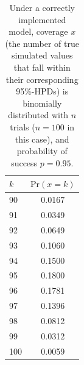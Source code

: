 \documentclass[oneside]{article}
\begin{document}
\begin{table}
\begin{center}
\begin{tabular}{l|c}
\hline
$k$ & $\text{Pr}(x=k)$ \\ %
\hline
90 & 0.0167 \\ %
91 & 0.0349 \\ %
92 & 0.0649 \\ %
93 & 0.1060 \\ %
94 & 0.1500 \\ %
95 & 0.1800 \\ %
96 & 0.1781 \\ %
97 & 0.1396 \\ %
98 & 0.0812 \\ %
99 & 0.0312 \\ %
100 & 0.0059 \\ %
\hline
\end{tabular}
\end{center}
\caption{Under a correctly implemented model, coverage $x$ (the number
  of true simulated values that fall within their corresponding 95\%-HPDs)
  is binomially distributed with $n$ trials ($n=100$ in this case),
  and probability of success $p=0.95$.}
\label{tab:coverage}
\end{table}
\end{document}
